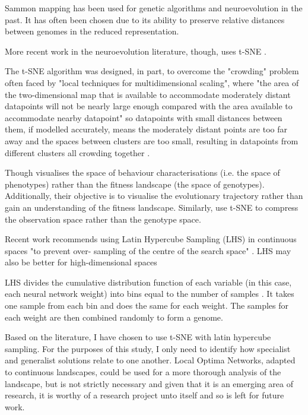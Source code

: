 \documentclass[12pt]{article}
\begin{document}
Sammon mapping \cite{sammon:IEEETR:1969} has been used for genetic algorithms  \cite{kim:GECCO:2003} and neuroevolution \cite{risi:AB:2010, silva:EC:2015} in the past.
It has often been chosen due to its ability to preserve relative distances between genomes in the reduced representation.

More recent work in the neuroevolution literature, though, \cite{wang:GECCO:2018, risi:GECCO:2019} uses t-SNE \cite{vanDerMaaten:JMLR:2008}.

The t-SNE algorithm was designed, in part, to overcome the "crowding" problem often faced by "local techniques for multidimensional scaling", where "the area of the two-dimensional map that is available to accommodate moderately distant datapoints will not be nearly large enough compared with the area available to accommodate nearby datapoint" so datapoints with small distances between them, if modelled accurately, means the moderately distant points are too far away and the spaces between clusters are too small, resulting in datapoints from different clusters all crowding together \cite{vanDerMaaten:JMLR:2008}.

Though \cite{wang:GECCO:2018} visualises the space of behaviour characterisations (i.e. the space of phenotypes) rather than the fitness landscape (the space of genotypes).
Additionally, their objective is to visualise the evolutionary trajectory rather than gain an understanding of the fitness landscape.
Similarly, \cite{risi:GECCO:2019} use t-SNE to compress the observation space rather than the genotype space.

Recent work recommends using Latin Hypercube Sampling (LHS) in continuous spaces "to prevent over- sampling of the centre of the search space" \cite{ochoa:GECCO:2019}.
LHS may also be better for high-dimensional spaces  \cite{contreras:ICBMTA:2020}

LHS divides the cumulative distribution function of each variable (in this case, each neural network weight) into bins equal to the number of samples \cite{helton:RESS:2003}.
It takes one sample from each bin and does the same for each weight.
The samples for each weight are then combined randomly to form a genome.

Based on the literature, I have chosen to use t-SNE with latin hypercube sampling. For the purposes of this study, I only need to identify how specialist and generalist solutions relate to one another. Local Optima Networks, adapted to continuous landscapes, could be used for a more thorough analysis of the landscape, but is not strictly necessary and given that it is an emerging area of research, it is worthy of a research project unto itself and so is left for future work.
\end{document}
